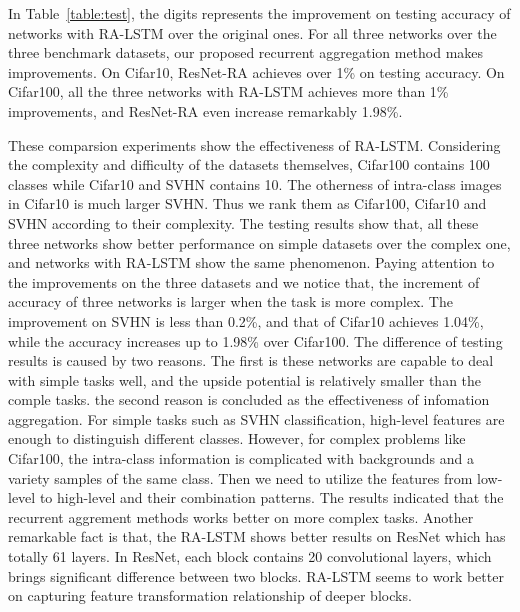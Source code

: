 \documentclass[runningheads]{llncs}
\begin{document}
In Table~\ref{table:test}, the digits represents the improvement on testing accuracy of networks with RA-LSTM over the original ones. For all three networks over the three benchmark datasets, our proposed recurrent aggregation method makes improvements. On Cifar10, ResNet-RA achieves over 1\% on testing accuracy. On Cifar100, all the three networks with RA-LSTM achieves more than 1\% improvements, and ResNet-RA even increase remarkably 1.98\%.

These comparsion experiments show the effectiveness of RA-LSTM. Considering the complexity and difficulty of the datasets themselves, Cifar100 contains 100 classes while Cifar10 and SVHN contains 10. The otherness of intra-class images in Cifar10 is much larger SVHN. Thus we rank them as Cifar100, Cifar10 and SVHN according to their complexity. The testing results show that, all these three networks show better performance on simple datasets over the complex one, and networks with RA-LSTM show the same phenomenon. Paying attention to the improvements on the three datasets and we notice that, the increment of accuracy of three networks is larger when the task is more complex. The improvement on SVHN is less than 0.2\%, and that of Cifar10 achieves 1.04\%, while the accuracy increases up to 1.98\% over Cifar100. The difference of testing results is caused by two reasons. The first is these networks are capable to deal with simple tasks well, and the upside potential is relatively smaller than the comple tasks. the second reason is concluded as the effectiveness of infomation aggregation. For simple tasks such as SVHN classification, high-level features are enough to distinguish different classes. However, for complex problems like Cifar100, the intra-class information is complicated with backgrounds and a variety samples of the same class. Then we need to utilize the features from low-level to high-level and their combination patterns. The results indicated that the recurrent aggrement methods works better on more complex tasks. Another remarkable fact is that, the RA-LSTM shows better results on ResNet which has totally 61 layers. In ResNet, each block contains 20 convolutional layers, which brings significant difference between two blocks. RA-LSTM seems to work better on capturing feature transformation relationship of deeper blocks.
\end{document}
